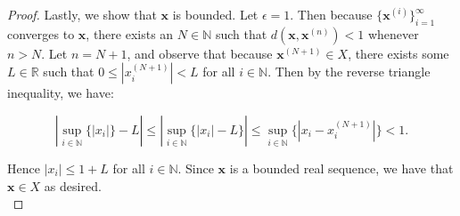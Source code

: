 \begin{proof}
 Lastly, we show that $\textbf{x}$ is bounded. Let $\epsilon = 1$. Then because $\{\textbf{x}^{(i)}\}_{i=1}^{\infty}$
 converges to $\textbf{x}$, there exists an $N \in \mathbb{N}$ such that $d(\textbf{x}, \textbf{x}^{(n)}) < 1$ whenever
 $n > N$. Let $n = N + 1$, and observe that because $\textbf{x}^{(N+1)} \in X$, there exists some $L \in \mathbb{R}$
 such that $0 \le \left|x_i^{(N+1)}\right| < L$ for all $i \in \mathbb{N}$.
 Then by the reverse triangle inequality, we have:

 \begin{equation*}
 \left| \sup\limits_{i \in \mathbb{N}}{\{|x_i|\}} - L \right| 
    \le \left| \sup\limits_{i \in \mathbb{N}}{\{|x_i| - L\}} \right| 
    \le \sup\limits_{i \in \mathbb{N}}{\{|x_i - x_i^{(N+1)}|\}}
    < 1. 
 \end{equation*}

 Hence $|x_i| \le 1 + L$ for all $i \in \mathbb{N}$. Since $\textbf{x}$ is a bounded real sequence, we have that
 $\textbf{x} \in X$ as desired.
 \\
\end{proof}

\pagebreak